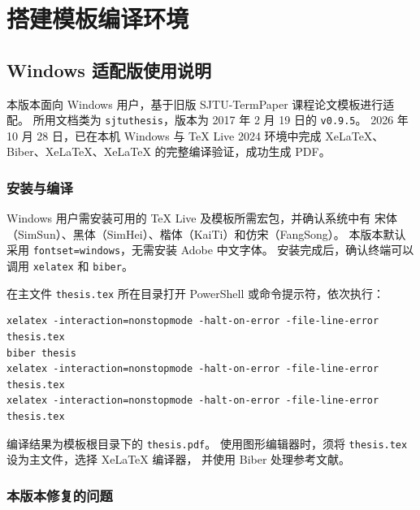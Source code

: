 \chapter{搭建模板编译环境}

\section{Windows 适配版使用说明}

本版本面向 Windows 用户，基于旧版 SJTU-TermPaper 课程论文模板进行适配。
所用文档类为 \texttt{sjtuthesis}，版本为 2017 年 2 月 19 日的 \texttt{v0.9.5}。
2026 年 10 月 28 日，已在本机 Windows 与 TeX Live 2024 环境中完成
XeLaTeX、Biber、XeLaTeX、XeLaTeX 的完整编译验证，成功生成 PDF。

\subsection{安装与编译}

Windows 用户需安装可用的 TeX Live 及模板所需宏包，并确认系统中有
宋体（SimSun）、黑体（SimHei）、楷体（KaiTi）和仿宋（FangSong）。
本版本默认采用 \texttt{fontset=windows}，无需安装 Adobe 中文字体。
安装完成后，确认终端可以调用 \texttt{xelatex} 和 \texttt{biber}。

在主文件 \texttt{thesis.tex} 所在目录打开 PowerShell 或命令提示符，依次执行：

\begin{lstlisting}[basicstyle=\small\ttfamily, numbers=none, breaklines=true]
xelatex -interaction=nonstopmode -halt-on-error -file-line-error thesis.tex
biber thesis
xelatex -interaction=nonstopmode -halt-on-error -file-line-error thesis.tex
xelatex -interaction=nonstopmode -halt-on-error -file-line-error thesis.tex
\end{lstlisting}

编译结果为模板根目录下的 \texttt{thesis.pdf}。
使用图形编辑器时，须将 \texttt{thesis.tex} 设为主文件，选择 XeLaTeX 编译器，
并使用 Biber 处理参考文献。

\subsection{本版本修复的问题}

